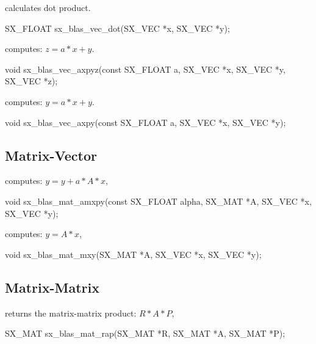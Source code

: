  calculates dot product.
\begin{evb}
SX_FLOAT sx_blas_vec_dot(SX_VEC *x, SX_VEC *y);
\end{evb}

 computes: $z = a * x + y$.
\begin{evb}
void sx_blas_vec_axpyz(const SX_FLOAT a, SX_VEC *x, SX_VEC *y, SX_VEC *z);
\end{evb}

 computes: $y = a * x + y$.
\begin{evb}
void sx_blas_vec_axpy(const SX_FLOAT a, SX_VEC *x, SX_VEC *y);
\end{evb}

\subsection{Matrix-Vector}
 computes: $ y = y + a * A * x $,
\begin{evb}
void sx_blas_mat_amxpy(const SX_FLOAT alpha, SX_MAT *A, SX_VEC *x, SX_VEC *y);
\end{evb}

 computes: $y = A * x $,
\begin{evb}
void sx_blas_mat_mxy(SX_MAT *A, SX_VEC *x, SX_VEC *y);
\end{evb}

\subsection{Matrix-Matrix}
 returns the matrix-matrix product: $ R * A * P$,
\begin{evb}
SX_MAT sx_blas_mat_rap(SX_MAT *R, SX_MAT *A, SX_MAT *P);
\end{evb}
